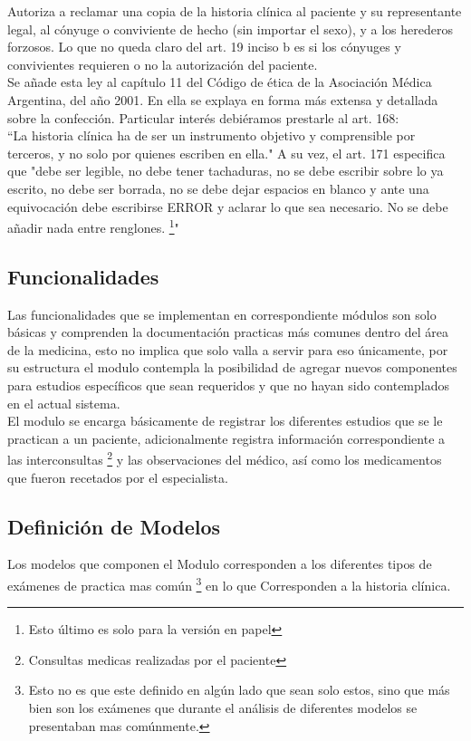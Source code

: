 Autoriza a reclamar una copia de la historia clínica al paciente y su representante legal, al cónyuge o conviviente de hecho (sin importar el sexo), y a los herederos forzosos. Lo que no queda claro del art. 19 inciso b es si los cónyuges y convivientes requieren o no la autorización del paciente.\\[0.1cm]

Se añade esta ley al capítulo 11 del Código de ética de la Asociación Médica Argentina, del año 2001. En ella se explaya en forma más extensa y detallada sobre la confección. Particular interés debiéramos prestarle al art. 168:\\[0.1cm]

``La historia clínica ha de ser un instrumento objetivo y comprensible por terceros, y no solo por quienes escriben en ella." A su vez, el art. 171 especifica que "debe ser legible, no debe tener tachaduras, no se debe escribir sobre lo ya escrito, no debe ser borrada, no se debe dejar espacios en blanco y ante una equivocación debe escribirse ERROR y aclarar lo que sea necesario. No se debe añadir nada entre renglones. \footnote{Esto último es solo para la versión en papel}"


\subsection{Funcionalidades}

Las funcionalidades que se implementan en correspondiente módulos son solo básicas y comprenden la documentación practicas más comunes dentro del área de la medicina, esto no implica que solo valla a servir para eso únicamente, por su estructura el modulo contempla la posibilidad de agregar nuevos componentes para estudios específicos que sean requeridos y que no hayan sido contemplados en el actual sistema.\\[0.1cm]

El modulo se encarga básicamente de registrar los diferentes estudios que se le practican a un paciente, adicionalmente registra información correspondiente a las interconsultas \footnote{Consultas medicas realizadas por el paciente} y las observaciones del médico, así como los medicamentos que fueron recetados por el especialista.


\subsection{Definición de Modelos}

Los modelos que componen el Modulo corresponden a los diferentes tipos de exámenes de practica mas común \footnote{Esto no es que este definido en algún lado que sean solo estos, sino que más bien son los exámenes que durante el análisis de diferentes modelos se presentaban mas comúnmente.} en lo que 
Corresponden a la historia clínica.\\[0.1cm]

